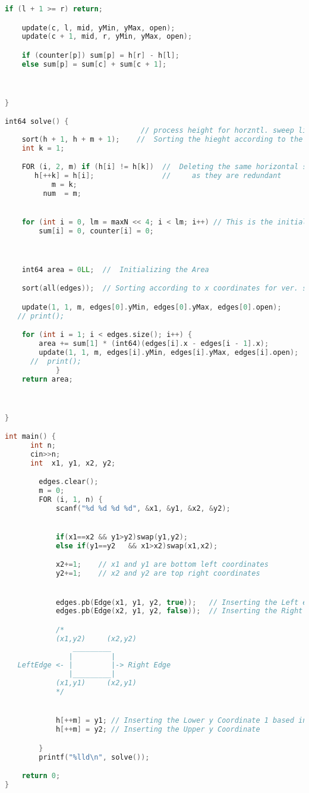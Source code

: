\documentclass[12pt,a4paper, twoside]{report}
\begin{document}
\begin{lstlisting}[caption=Área da união de retângulos (N log N) - Outra implementação,language=C++]
    if (l + 1 >= r) return;

    update(c, l, mid, yMin, yMax, open);
    update(c + 1, mid, r, yMin, yMax, open);

    if (counter[p]) sum[p] = h[r] - h[l];
    else sum[p] = sum[c] + sum[c + 1];



}

int64 solve() {
                                // process height for horzntl. sweep line
    sort(h + 1, h + m + 1);    //  Sorting the hieght according to the y coordinates
    int k = 1;

    FOR (i, 2, m) if (h[i] != h[k])  //  Deleting the same horizontal sweeplines
       h[++k] = h[i];                //     as they are redundant
           m = k;
         num  = m;


    for (int i = 0, lm = maxN << 4; i < lm; i++) // This is the initialization step of segment tree
        sum[i] = 0, counter[i] = 0;



    int64 area = 0LL;  //  Initializing the Area

    sort(all(edges));  // Sorting according to x coordinates for ver. swp line

    update(1, 1, m, edges[0].yMin, edges[0].yMax, edges[0].open);
   // print();

    for (int i = 1; i < edges.size(); i++) {
        area += sum[1] * (int64)(edges[i].x - edges[i - 1].x);
        update(1, 1, m, edges[i].yMin, edges[i].yMax, edges[i].open);
      //  print();
            }
    return area;



}

int main() {
      int n;
      cin>>n;
      int  x1, y1, x2, y2;

        edges.clear();
        m = 0;
        FOR (i, 1, n) {
            scanf("%d %d %d %d", &x1, &y1, &x2, &y2);


            if(x1==x2 && y1>y2)swap(y1,y2);
            else if(y1==y2   && x1>x2)swap(x1,x2);

            x2+=1;    // x1 and y1 are bottom left coordinates
            y2+=1;    // x2 and y2 are top right coordinates


            edges.pb(Edge(x1, y1, y2, true));   // Inserting the Left edge
            edges.pb(Edge(x2, y1, y2, false));  // Inserting the Right Edge

            /*
            (x1,y2)     (x2,y2)
                _________
               |         |
   LeftEdge <- |         |-> Right Edge
               |_________|
            (x1,y1)     (x2,y1)
            */


            h[++m] = y1; // Inserting the Lower y Coordinate 1 based inddexiing
            h[++m] = y2; // Inserting the Upper y Coordinate

        }
        printf("%lld\n", solve());

    return 0;
}

\end{lstlisting}
\end{document}
